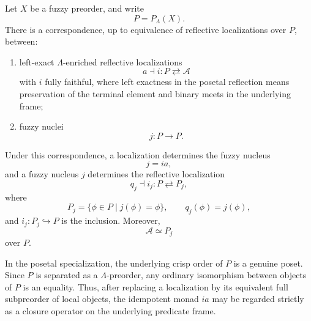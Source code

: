 \begin{theorem}
\label{thm:posetal-comparison-localizations-nuclei}
Let \(X\) be a fuzzy preorder, and write
\[
    P=P_\Lambda(X).
\]
There is a correspondence, up to equivalence of reflective localizations over \(P\),
between:
\begin{enumerate}[label=\textup{(\arabic*)}]
    \item left-exact \(\Lambda\)-enriched reflective localizations
    \[
        a\dashv i:
        P\rightleftarrows\mathcal A
    \]
    with \(i\) fully faithful, where left exactness in the posetal reflection means
    preservation of the terminal element and binary meets in the underlying frame;

    \item fuzzy nuclei
    \[
        j:P\to P.
    \]
\end{enumerate}
Under this correspondence, a localization determines the fuzzy nucleus
\[
    j=ia,
\]
and a fuzzy nucleus \(j\) determines the reflective localization
\[
    q_j\dashv i_j:
    P\rightleftarrows P_j,
\]
where
\[
    P_j=\{\phi\in P\mid j(\phi)=\phi\},
    \qquad
    q_j(\phi)=j(\phi),
\]
and \(i_j:P_j\hookrightarrow P\) is the inclusion. Moreover,
\[
    \mathcal A\simeq P_j
\]
over \(P\).

In the posetal specialization, the underlying crisp order of \(P\) is a genuine
poset. Since \(P\) is separated as a \(\Lambda\)-preorder, any ordinary isomorphism
between objects of \(P\) is an equality. Thus, after replacing a localization by its
equivalent full subpreorder of local objects, the idempotent monad \(ia\) may be
regarded strictly as a closure operator on the underlying predicate frame.
\end{theorem}


